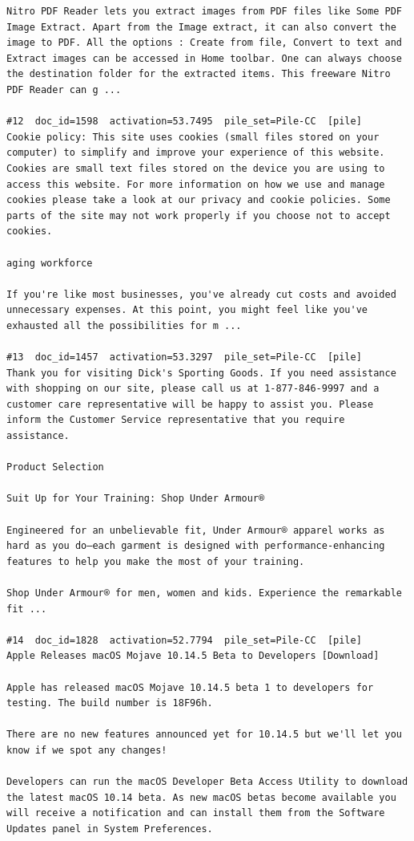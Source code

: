 \begin{verbatim}
Nitro PDF Reader lets you extract images from PDF files like Some PDF Image Extract. Apart from the Image extract, it can also convert the image to PDF. All the options : Create from file, Convert to text and Extract images can be accessed in Home toolbar. One can always choose the destination folder for the extracted items. This freeware Nitro PDF Reader can g ...

#12  doc_id=1598  activation=53.7495  pile_set=Pile-CC  [pile]
Cookie policy: This site uses cookies (small files stored on your computer) to simplify and improve your experience of this website. Cookies are small text files stored on the device you are using to access this website. For more information on how we use and manage cookies please take a look at our privacy and cookie policies. Some parts of the site may not work properly if you choose not to accept cookies.

aging workforce

If you're like most businesses, you've already cut costs and avoided unnecessary expenses. At this point, you might feel like you've exhausted all the possibilities for m ...

#13  doc_id=1457  activation=53.3297  pile_set=Pile-CC  [pile]
Thank you for visiting Dick's Sporting Goods. If you need assistance with shopping on our site, please call us at 1-877-846-9997 and a customer care representative will be happy to assist you. Please inform the Customer Service representative that you require assistance.

Product Selection

Suit Up for Your Training: Shop Under Armour®

Engineered for an unbelievable fit, Under Armour® apparel works as hard as you do—each garment is designed with performance-enhancing features to help you make the most of your training.

Shop Under Armour® for men, women and kids. Experience the remarkable fit ...

#14  doc_id=1828  activation=52.7794  pile_set=Pile-CC  [pile]
Apple Releases macOS Mojave 10.14.5 Beta to Developers [Download]

Apple has released macOS Mojave 10.14.5 beta 1 to developers for testing. The build number is 18F96h.

There are no new features announced yet for 10.14.5 but we'll let you know if we spot any changes!

Developers can run the macOS Developer Beta Access Utility to download the latest macOS 10.14 beta. As new macOS betas become available you will receive a notification and can install them from the Software Updates panel in System Preferences.


\end{verbatim}
